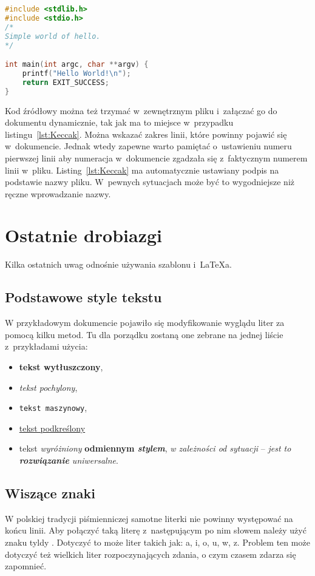 \begin{lstlisting}[language=C,
    backgroundcolor=\color{EEGold!5!white},
    caption={Prosty program w~języku C},
    label={lst:helloC}]
#include <stdlib.h>
#include <stdio.h>
/* 
Simple world of hello.
*/

int main(int argc, char **argv) {
	printf("Hello World!\n");
	return EXIT_SUCCESS;
}
\end{lstlisting}

Kod źródłowy można też trzymać w~zewnętrznym pliku i~załączać go do dokumentu dynamicznie, tak jak ma to miejsce w~przypadku listingu~\ref{lst:Keccak}. Można wskazać zakres linii, które powinny pojawić się w~dokumencie. Jednak wtedy zapewne warto pamiętać o~ustawieniu numeru pierwszej linii aby numeracja w~dokumencie zgadzała się z~faktycznym numerem linii w~pliku. Listing~\ref{lst:Keccak} ma automatycznie ustawiany podpis na podstawie nazwy pliku. W~pewnych sytuacjach może być to wygodniejsze niż ręczne wprowadzanie nazwy.



\section{Ostatnie drobiazgi}
Kilka ostatnich uwag odnośnie używania szablonu i~\LaTeX{a}.

\subsection{Podstawowe style tekstu}
W przykładowym dokumencie pojawiło się modyfikowanie wyglądu liter za pomocą kilku metod. Tu dla porządku zostaną one zebrane na jednej liście z~przykładami użycia:
\begin{itemize}
    \item \textbf{tekst wytłuszczony},
    \item \textit{tekst pochylony},
    \item \texttt{tekst maszynowy},
    \item \underline{tekst podkreślony}
    \item tekst \emph{wyróżniony} \textbf{odmiennym \emph{stylem}}, \textit{w zależności \emph{od sytuacji}} -- \emph{jest to \textbf{rozwiązanie} \textit{uniwersalne}}.
\end{itemize}

\subsection{Wiszące znaki}
W polskiej tradycji piśmienniczej samotne literki nie powinny występować na końcu linii. Aby połączyć taką literę z~następującym po nim słowem należy użyć znaku tyldy \keys{\textasciitilde{}}. Dotyczyć to może liter takich jak: a, i, o, u, w, z. Problem ten może dotyczyć też wielkich liter rozpoczynających zdania, o czym czasem zdarza się zapomnieć.


